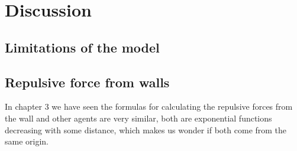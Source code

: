 \section{Discussion}\label{sec:discussion}
\subsection{Limitations of the model}

\subsection{Repulsive force from walls}
In chapter 3 we have seen the formulas for calculating the repulsive forces from the wall and other agents are very similar, both are exponential functions decreasing with some distance, which makes us wonder if both come from the same origin.\\

